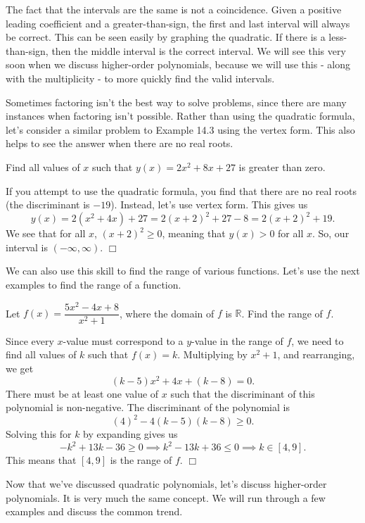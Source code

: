 \documentclass[lang=en,11pt]{elegantbook}
\begin{document}
\begin{remark}
The fact that the intervals are the same is not a coincidence.  Given a positive leading coefficient and a greater-than-sign, the first and last interval will always be correct.  This can be seen easily by graphing the quadratic.  If there is a less-than-sign, then the middle interval is the correct interval.  We will see this very soon when we discuss higher-order polynomials, because we will use this - along with the multiplicity - to more quickly find the valid intervals.
\end{remark}
Sometimes factoring isn't the best way to solve problems, since there are many instances when factoring isn't possible.  Rather than using the quadratic formula, let's consider a similar problem to Example 14.3 using the vertex form.  This also helps to see the answer when there are no real roots.
\begin{example}
Find all values of $x$ such that $y(x)=2x^2+8x+27$ is greater than zero.
\end{example}
\begin{solution}
If you attempt to use the quadratic formula, you find that there are no real roots (the discriminant is $-19$).  Instead, let's use vertex form.  This gives us $$y(x)=2(x^2+4x)+27=2(x+2)^2+27-8=2(x+2)^2+19.$$ We see that for all $x$, $(x+2)^2\geq 0$, meaning that $y(x)>0$ for all $x$.  So, our interval is $(-\infty,\infty)$. $\Box$
\end{solution}
We can also use this skill to find the range of various functions.  Let's use the next examples to find the range of a function.
\begin{example}
Let $f(x)=\dfrac{5x^2-4x+8}{x^2+1}$, where the domain of $f$ is $\mathbb{R}$.  Find the range of $f$.
\end{example}
\begin{solution}
Since every $x$-value must correspond to a $y$-value in the range of $f$, we need to find all values of $k$ such that $f(x)=k$.  Multiplying by $x^2+1$, and rearranging, we get $$(k-5)x^2+4x+(k-8)=0.$$ There must be at least one value of $x$ such that the discriminant of this polynomial is non-negative.  The discriminant of the polynomial is $$(4)^2-4(k-5)(k-8)\geq 0.$$  Solving this for $k$ by expanding gives us $$-k^2+13k-36\geq 0 \implies k^2-13k+36\leq 0 \implies k\in[4,9].$$  This means that $[4,9]$ is the range of $f$. $\Box$
\end{solution}
Now that we've discussed quadratic polynomials, let's discuss higher-order polynomials.  It is very much the same concept.  We will run through a few examples and discuss the common trend.
\end{document}
